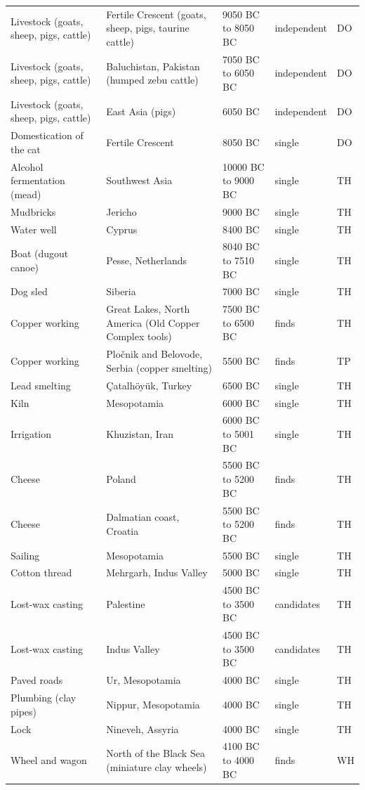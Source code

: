 \documentclass[11pt,a4paper]{article}
\begin{document}
\begin{longtable}{p{3.3cm}p{5.2cm}p{3.3cm}p{1.7cm}l}
Livestock (goats, sheep, pigs, cattle) & Fertile Crescent (goats, sheep, pigs, taurine cattle) & 9050 BC to 8050 BC & independent & DO\\
Livestock (goats, sheep, pigs, cattle) & Baluchistan, Pakistan (humped zebu cattle) & 7050 BC to 6050 BC & independent & DO\\
Livestock (goats, sheep, pigs, cattle) & East Asia (pigs) & 6050 BC & independent & DO\\
Domestication of the cat & Fertile Crescent & 8050 BC & single & DO\\
Alcohol fermentation (mead) & Southwest Asia & 10000 BC to 9000 BC & single & TH\\
Mudbricks & Jericho & 9000 BC & single & TH\\
Water well & Cyprus & 8400 BC & single & TH\\
Boat (dugout canoe) & Pesse, Netherlands & 8040 BC to 7510 BC & single & TH\\
Dog sled & Siberia & 7000 BC & single & TH\\
Copper working & Great Lakes, North America (Old Copper Complex tools) & 7500 BC to 6500 BC & finds & TH\\
Copper working & Pločnik and Belovode, Serbia (copper smelting) & 5500 BC & finds & TP\\
Lead smelting & Çatalhöyük, Turkey & 6500 BC & single & TH\\
Kiln & Mesopotamia & 6000 BC & single & TH\\
Irrigation & Khuzistan, Iran & 6000 BC to 5001 BC & single & TH\\
Cheese & Poland & 5500 BC to 5200 BC & finds & TH\\
Cheese & Dalmatian coast, Croatia & 5500 BC to 5200 BC & finds & TH\\
Sailing & Mesopotamia & 5500 BC & single & TH\\
Cotton thread & Mehrgarh, Indus Valley & 5000 BC & single & TH\\
Lost-wax casting & Palestine & 4500 BC to 3500 BC & candidates & TH\\
Lost-wax casting & Indus Valley & 4500 BC to 3500 BC & candidates & TH\\
Paved roads & Ur, Mesopotamia & 4000 BC & single & TH\\
Plumbing (clay pipes) & Nippur, Mesopotamia & 4000 BC & single & TH\\
Lock & Nineveh, Assyria & 4000 BC & single & TH\\
Wheel and wagon & North of the Black Sea (miniature clay wheels) & 4100 BC to 4000 BC & finds & WH\\

\end{longtable}
\end{document}
